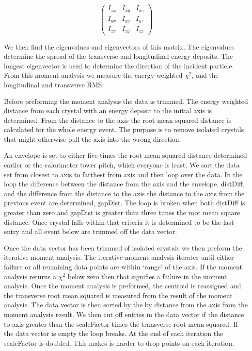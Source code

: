 \documentclass[11pt]{article}
\begin{document}
\[ \left( \begin{array}{ccc}
I_{xx} & I_{xy} & I_{xz} \\
I_{yx} & I_{yy} & I_{yz} \\
I_{zx} & I_{zy} & I_{zz} \end{array} \right)\] 

We then find the eigenvalues and eigenvectors of this matrix.  The eigenvalues determine the spread of the transverse and longitudinal energy deposits.  The longest eigenvector is used to determine the direction of the incident particle.  From this moment analysis we measure the energy weighted $\chi^2$, and the longitudinal and transverse RMS.

Before preforming the moment analysis the data is trimmed.  The energy weighted distance from each crystal with an energy deposit to the initial axis is determined.  From the distance to the axis the root mean squared distance is calculated for the whole energy event.  The purpose is to remove isolated crystals that might otherwise pull the axis into the wrong direction.  

An envelope is set to either five times the root mean squared distance determined earlier or the calorimeter tower pitch, which everyone is least.  We sort the data set from closest to axis to farthest from axis and then loop over the data.  In the loop the difference between the distance from the axis and the envelope, distDiff, and the difference from the distance to the axis the distance to the axis from the previous event are determined, gapDist.  The loop is broken when both distDiff is greater than zero and gapDist is greater than three times the root mean square distance. Once crystal falls within that criteria it is determined to be the last entry and all event below are trimmed off the data vector.   

Once the data vector has been trimmed of isolated crystals we then preform the iterative moment analysis.  The iterative moment analysis iterates until either failure or all remaining data points are within `range' of the axis.  If the moment analysis returns a $\chi^2$ below zero then that signifies a failure in the moment analysis.  Once the moment analysis is preformed, the centroid is reassigned and the transverse root mean squared is measured from the result of the moment analysis.  The data vector is then sorted by the by distance from the axis from the moment analysis result.  We then cut off entries in the data vector if the distance to axis greater than the scaleFactor times the transverse root mean squared.  If the data vector is empty the loop breaks.  At the end of each iteration the scaleFactor is doubled.  This makes is harder to drop points on each iteration.  
\end{document}
